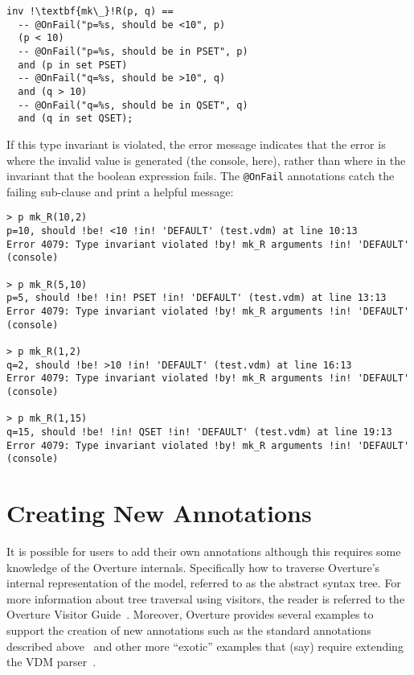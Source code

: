 \begin{lstlisting}[language=VDM++, frame=tlbr, escapechar=!]
inv !\textbf{mk\_}!R(p, q) ==
  -- @OnFail("p=%s, should be <10", p)
  (p < 10)
  -- @OnFail("p=%s, should be in PSET", p)
  and (p in set PSET)
  -- @OnFail("q=%s, should be >10", q)
  and (q > 10)
  -- @OnFail("q=%s, should be in QSET", q)
  and (q in set QSET);
\end{lstlisting}

If this type invariant is violated, the error message indicates that
the error is where the invalid value is generated (the console, here),
rather than where in the invariant that the boolean expression
fails. The \lstinline[language=VDM++]|@OnFail| annotations catch the
failing sub-clause and print a helpful message:

\begin{lstlisting}[style=tool,escapechar=!, breaklines=true]
> p mk_R(10,2)
p=10, should !be! <10 !in! 'DEFAULT' (test.vdm) at line 10:13
Error 4079: Type invariant violated !by! mk_R arguments !in! 'DEFAULT' (console)

> p mk_R(5,10)
p=5, should !be! !in! PSET !in! 'DEFAULT' (test.vdm) at line 13:13
Error 4079: Type invariant violated !by! mk_R arguments !in! 'DEFAULT' (console)

> p mk_R(1,2)
q=2, should !be! >10 !in! 'DEFAULT' (test.vdm) at line 16:13
Error 4079: Type invariant violated !by! mk_R arguments !in! 'DEFAULT' (console)

> p mk_R(1,15)
q=15, should !be! !in! QSET !in! 'DEFAULT' (test.vdm) at line 19:13
Error 4079: Type invariant violated !by! mk_R arguments !in! 'DEFAULT' (console)
\end{lstlisting}

\section{Creating New Annotations}

It is possible for users to add their own annotations although this
requires some knowledge of the Overture internals. Specifically how to
traverse Overture's internal representation of the model, referred to
as the abstract syntax tree. For more information about tree traversal
using visitors, the reader is referred to the Overture Visitor
Guide~\cite{VisitorGuide}. Moreover, Overture provides several
examples to support the creation of new annotations such as the
standard annotations described above~\cite{AnnotationsProvided} and
other more ``exotic'' examples that (say) require extending the VDM
parser~\cite{AnnotationsExamples}.

